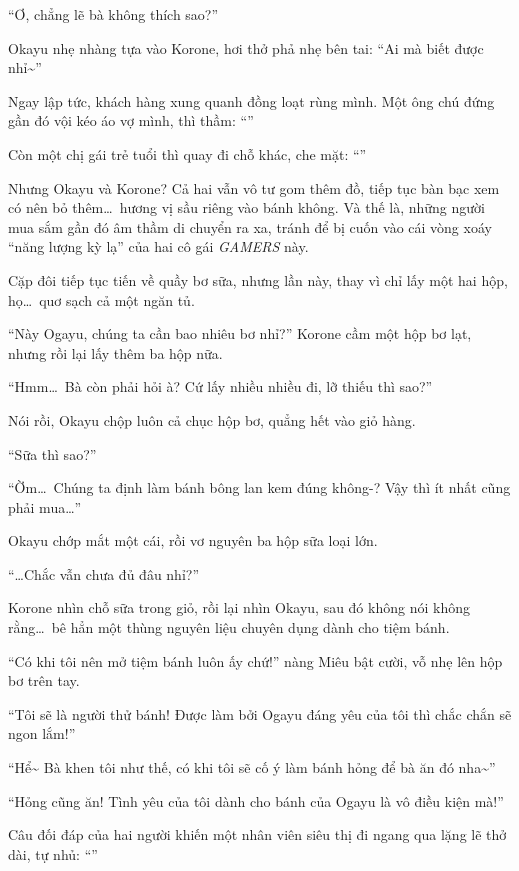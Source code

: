 \documentclass[../main.tex]{subfiles}
\begin{document}
``Ơ, chẳng lẽ bà không thích sao?''

Okayu nhẹ nhàng tựa vào Korone, hơi thở phả nhẹ bên tai: ``Ai mà biết được nhỉ\~{}''

Ngay lập tức, khách hàng xung quanh đồng loạt rùng mình. Một ông chú đứng gần đó vội kéo áo vợ mình, thì thầm: ``''

Còn một chị gái trẻ tuổi thì quay đi chỗ khác, che mặt: ``''

Nhưng Okayu và Korone? Cả hai vẫn vô tư gom thêm đồ, tiếp tục bàn bạc xem có nên bỏ thêm\dots\ hương vị sầu riêng vào bánh không. Và thế là, những người mua sắm gần đó âm thầm di chuyển ra xa, tránh để bị cuốn vào cái vòng xoáy ``năng lượng kỳ lạ'' của hai cô gái \textit{GAMERS} này.

\ct

Cặp đôi tiếp tục tiến về quầy bơ sữa, nhưng lần này, thay vì chỉ lấy một hai hộp, họ\dots\ quơ sạch cả một ngăn tủ.

``Này Ogayu, chúng ta cần bao nhiêu bơ nhỉ?'' Korone cầm một hộp bơ lạt, nhưng rồi lại lấy thêm ba hộp nữa.

``Hmm\dots\ Bà còn phải hỏi à? Cứ lấy nhiều nhiều đi, lỡ thiếu thì sao?''

Nói rồi, Okayu chộp luôn cả chục hộp bơ, quẳng hết vào giỏ hàng.

``Sữa thì sao?''

``Ờm\dots\ Chúng ta định làm bánh bông lan kem đúng không-? Vậy thì ít nhất cũng phải mua\dots''

Okayu chớp mắt một cái, rồi vơ nguyên ba hộp sữa loại lớn.

``\dots Chắc vẫn chưa đủ đâu nhỉ?''

Korone nhìn chỗ sữa trong giỏ, rồi lại nhìn Okayu, sau đó không nói không rằng\dots\ bê hẳn một thùng nguyên liệu chuyên dụng dành cho tiệm bánh.

``Có khi tôi nên mở tiệm bánh luôn ấy chứ!'' nàng Miêu bật cười, vỗ nhẹ lên hộp bơ trên tay.

``Tôi sẽ là người thử bánh! Được làm bởi Ogayu đáng yêu của tôi thì chắc chắn sẽ ngon lắm!''

``Hể\~{} Bà khen tôi như thế, có khi tôi sẽ cố ý làm bánh hỏng để bà ăn đó nha\~{}''

``Hỏng cũng ăn! Tình yêu của tôi dành cho bánh của Ogayu là vô điều kiện mà!''

Câu đối đáp của hai người khiến một nhân viên siêu thị đi ngang qua lặng lẽ thở dài, tự nhủ: ``''
\end{document}
